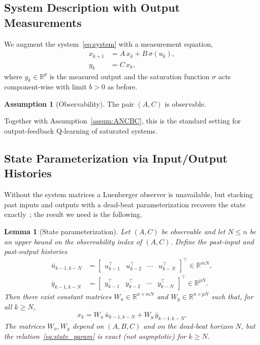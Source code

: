 \documentclass[final,5p,times,authoryear]{elsarticle}
\theoremstyle{plain}
\newtheorem{lemma}{Lemma}
\theoremstyle{definition}
\newtheorem{assumption}{Assumption}
\theoremstyle{remark}
\begin{document}
\subsection{System Description with Output Measurements}
\label{sec:of_system}

We augment the system~\eqref{eq:system} with a measurement equation,
\begin{align}
x_{k+1} &= A\,x_k + B\,\sigma(u_k), \label{eq:of_system_x}\\
y_k     &= C\,x_k, \label{eq:of_system_y}
\end{align}
where $y_k \in \mathbb{R}^p$ is the measured output and the saturation function
$\sigma$ acts component-wise with limit $b > 0$ as before.

\begin{assumption}[Observability]\label{assum:obs}
The pair $(A, C)$ is observable.
\end{assumption}

Together with Assumption~\ref{assum:ANCBC}, this is the standard
setting for output-feedback Q-learning of saturated systems.

\subsection{State Parameterization via Input/Output Histories}
\label{sec:of_param}

Without the system matrices a Luenberger observer is unavailable, but
stacking past inputs and outputs with a dead-beat parameterization
recovers the state exactly~\citep{RizviLin2023book}; the result we need
is the following.

\begin{lemma}[State parameterization]
\label{lem:state_param}
Let $(A, C)$ be observable and let $N \leq n$ be an upper bound on the
observability index of $(A, C)$.  Define the past-input and
past-output histories
\begin{align}
\bar u_{k-1, k-N}
   &= \begin{bmatrix} u_{k-1}^{\!\top} & u_{k-2}^{\!\top}
                      & \cdots & u_{k-N}^{\!\top} \end{bmatrix}^{\!\top}
      \in \mathbb{R}^{mN}, \label{eq:past_u}\\[2pt]
\bar y_{k-1, k-N}
   &= \begin{bmatrix} y_{k-1}^{\!\top} & y_{k-2}^{\!\top}
                      & \cdots & y_{k-N}^{\!\top} \end{bmatrix}^{\!\top}
      \in \mathbb{R}^{pN}. \label{eq:past_y}
\end{align}
Then there exist constant matrices $W_u \in \mathbb{R}^{n \times mN}$ and
$W_y \in \mathbb{R}^{n \times pN}$ such that, for all $k \geq N$,
\begin{equation}
x_k = W_u\,\bar u_{k-1, k-N} + W_y\,\bar y_{k-1, k-N}.
\label{eq:state_param}
\end{equation}
The matrices $W_u, W_y$ depend on $(A, B, C)$ and on the dead-beat
horizon $N$, but the relation~\eqref{eq:state_param} is exact (not
asymptotic) for $k \geq N$.
\end{lemma}
\end{document}

